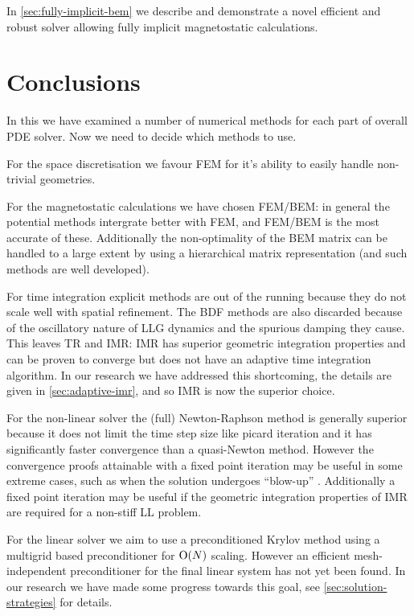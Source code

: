In \cref{sec:fully-implicit-bem} we describe and demonstrate a novel efficient and robust solver allowing fully implicit magnetostatic calculations.


\section{Conclusions}
\label{sec:num-meth-conclusions}

In this  we have examined a number of numerical methods for each part of overall PDE solver.
Now we need to decide which methods to use.

For the space discretisation we favour FEM for it's ability to easily handle non-trivial geometries.

For the magnetostatic calculations we have chosen FEM/BEM: in general the potential methods intergrate better with FEM, and FEM/BEM is the most accurate of these.
Additionally the non-optimality of the BEM matrix can be handled to a large extent by using a hierarchical matrix representation (and such methods are well developed).

For time integration explicit methods are out of the running because they do not scale well with spatial refinement.
The BDF methods are also discarded because of the oscillatory nature of LLG dynamics and the spurious damping they cause.
This leaves TR and IMR: IMR has superior geometric integration properties and can be proven to converge but does not have an adaptive time integration algorithm.
In our research we have addressed this shortcoming, the details are given in \cref{sec:adaptive-imr}, and so IMR is now the superior choice.

For the non-linear solver the (full) Newton-Raphson method is generally superior because it does not limit the time step size like picard iteration and it has significantly faster convergence than a quasi-Newton method.
However the convergence proofs attainable with a fixed point iteration may be useful in some extreme cases, such as when the solution undergoes ``blow-up'' \cite{something by numerical analyst guys}.
Additionally a fixed point iteration may be useful if the geometric integration properties of IMR are required for a non-stiff LL problem.

For the linear solver we aim to use a preconditioned Krylov method using a multigrid based preconditioner for $\mathrm{O}{\left( N \right)}$ scaling.
However an efficient mesh-independent preconditioner for the final linear system has not yet been found.
In our research we have made some progress towards this goal, see \cref{sec:solution-strategies} for details.

